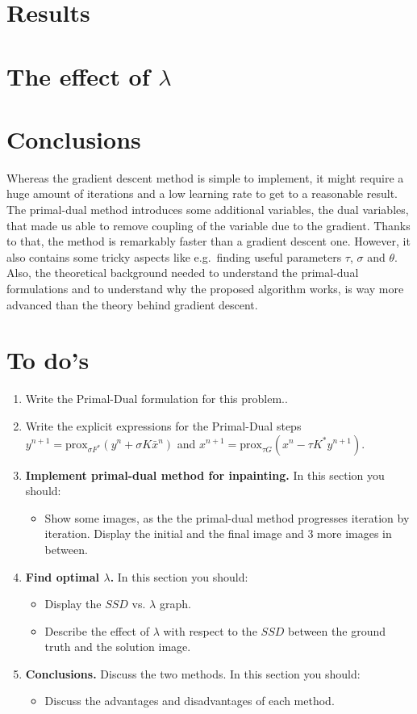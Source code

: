 \documentclass{paper}
\begin{document}
\section{Results}
\section{The effect of $\lambda$}
\section{Conclusions}
Whereas the gradient descent method is simple to implement, it might require a huge amount of iterations and a low learning rate to get to a reasonable result. 
The primal-dual method introduces some additional variables, the dual variables, that made us able to remove coupling of the variable due to the gradient. Thanks to that, the method is remarkably faster than a gradient descent one. However, it also contains some tricky aspects like e.g.\ finding useful parameters $\tau$, $\sigma$ and $\theta$. Also, the theoretical background needed to understand the primal-dual formulations and to understand why the proposed algorithm works, is way more advanced than the theory behind gradient descent.

\section{To do's}
\begin{enumerate}
\item Write the Primal-Dual formulation for this problem..

\item Write the explicit expressions for the Primal-Dual steps $y^{n+1} = \text{prox}_{\sigma F^*} (y^n + \sigma K \bar{x}^n)$ and $x^{n+1} = \text{prox}_{\tau G} (x^n  - \tau K^* y^{n+1})$.


\item \textbf{Implement primal-dual method for inpainting.} In this section you should:

\begin{itemize}
\item Show some images, as the the primal-dual method progresses iteration by iteration. Display the initial and the final image and 3 more images in between.
\end{itemize}
\item \textbf{ Find optimal $\lambda$.} In this section you should:

\begin{itemize}
\item Display the $SSD$ vs. $\lambda$ graph.
\item Describe the effect of $\lambda$ with respect to the $SSD$ between the ground truth and the solution image.
\end{itemize}

\item \textbf{ Conclusions.} Discuss the two methods. In this section you should:
\begin{itemize}
\item Discuss the advantages and disadvantages of each method.
\end{itemize}
\end{enumerate}


\nocite{*}


 
\end{document}
